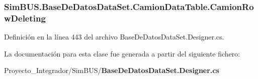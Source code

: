 \subsubsection[{Camion\-Row\-Deleting}]{ Sim\-B\-U\-S.\-Base\-De\-Datos\-Data\-Set.\-Camion\-Data\-Table.\-Camion\-Row\-Deleting}\label{class_sim_b_u_s_1_1_base_de_datos_data_set_1_1_camion_data_table_a004ce6ad633c24ac7bcacaf513eff907}


Definición en la línea 443 del archivo Base\-De\-Datos\-Data\-Set.\-Designer.\-cs.



La documentación para esta clase fue generada a partir del siguiente fichero\-:\begin{DoxyCompactItemize}
\item 
Proyecto\-\_\-\-Integrador/\-Sim\-B\-U\-S/{\bf Base\-De\-Datos\-Data\-Set.\-Designer.\-cs}\end{DoxyCompactItemize}
